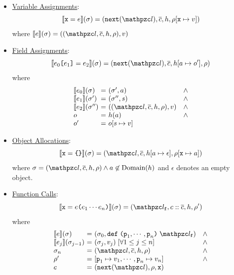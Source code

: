 \begin{itemize}
  \item \underline{Variable Assignments}:
    \[
      \sem{\varx = \expr}(\st) =
      (\getnext(\lab), \ctxts, \heap, \env[\varx \mapsto \val])
    \]
    where $\sem{\expr}(\st) = ((\lab, \ctxts, \heap, \env), \val)$

  \item \underline{Field Assignments}:
    \[
      \sem{\expr_0 \kwsl \expr_1 \kwsr = \expr_2}(\st) =
      (\getnext(\lab), \ctxts, \heap[\addr \mapsto \obj'], \env)
    \]
    where
    \[
      \begin{array}{l@{~}c@{~}ll}
        \sem{\expr_0}(\st) &=& (\st', \addr) &\wedge\\
        \sem{\expr_1}(\st') &=& (\st'', \str) &\wedge\\
        \sem{\expr_2}(\st'') &=& ((\lab, \ctxts, \heap, \env), \val) &\wedge\\
        \obj &=& \heap(\addr) &\wedge\\
        \obj' &=& \obj[\str \mapsto \val]\\
      \end{array}
    \]

  \item \underline{Object Allocations}:
    \[
      \sem{\varx = \kwcl \kwcr}(\st) =
      (\lab, \ctxts, \heap[\addr \mapsto \epsilon], \env[\varx \mapsto
      \addr])
    \]
    where $\st = (\lab, \ctxts, \heap, \env) \wedge \addr \not\in
    \text{Domain}(\heap)$ and $\epsilon$ denotes an empty object.

  \item \underline{Function Calls}:
    \[
      \sem{\varx = \expr \kwrl \expr_1 \cdots \expr_n \kwrr}(\st) =
      (\lab_\varf, \ctxt :: \ctxts, \heap, \env')
    \]
    where
    \[
      \begin{array}{l@{~}c@{~}ll}
        \sem{\expr}(\st) &=& (\st_0, \kwdef \; \kwrl \varp_1, \cdots, \varp_n
        \kwrr \; \lab_\varf) &\wedge\\
        \sem{\expr_j}(\st_{j-1}) &=& (\st_j, \val_j) \;
        [\forall 1 \leq j \leq n] &\wedge\\
        \st_n &=& (\lab, \ctxts, \heap, \env) &\wedge\\
        \env' &=& [\varp_1 \mapsto \val_1, \cdots, \varp_n \mapsto \val_n]
        &\wedge\\
        \ctxt &=& (\getnext(\lab), \env, \varx)\\
      \end{array}
    \]


\end{itemize}
